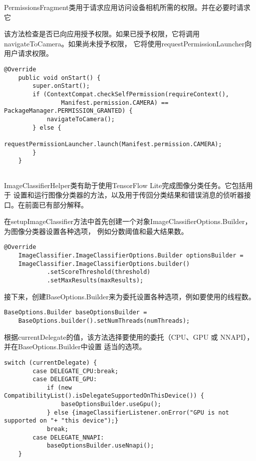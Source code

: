 PermissionsFragment类用于请求应用访问设备相机所需的权限。并在必要时请求它

该方法检查是否已向应用授予权限。如果已授予权限，它将调用navigateToCamera。如果尚未授予权限，
它将使用requestPermissionLauncher向用户请求权限。
\begin{lstlisting}[style=code]
    @Override
    public void onStart() {
        super.onStart();
        if (ContextCompat.checkSelfPermission(requireContext(),
                Manifest.permission.CAMERA) == PackageManager.PERMISSION_GRANTED) {
            navigateToCamera();
        } else {
            requestPermissionLauncher.launch(Manifest.permission.CAMERA);
        }
    }
    
\end{lstlisting}

ImageClassifierHelper类有助于使用TensorFlow Lite完成图像分类任务。它包括用于
设置和运行图像分类器的方法，以及用于传回分类结果和错误消息的侦听器接口。在前面已有部分解释。

在setupImageClassifier方法中首先创建一个对象ImageClassifierOptions.Builder，为图像分类器设置各种选项，
例如分数阈值和最大结果数。
\begin{lstlisting}[style=code]
    @Override
    ImageClassifier.ImageClassifierOptions.Builder optionsBuilder =
    ImageClassifier.ImageClassifierOptions.builder()
            .setScoreThreshold(threshold)
            .setMaxResults(maxResults);
\end{lstlisting}

接下来，创建BaseOptions.Builder来为委托设置各种选项，例如要使用的线程数。
\begin{lstlisting}[style=code]
    BaseOptions.Builder baseOptionsBuilder =
    BaseOptions.builder().setNumThreads(numThreads);
\end{lstlisting}

根据currentDelegate的值，该方法选择要使用的委托（CPU、GPU 或 NNAPI），并在BaseOptions.Builder中设置
适当的选项。
\begin{lstlisting}[style=code]
    switch (currentDelegate) {
        case DELEGATE_CPU:break;
        case DELEGATE_GPU:
            if (new CompatibilityList().isDelegateSupportedOnThisDevice()) {
                baseOptionsBuilder.useGpu();
            } else {imageClassifierListener.onError("GPU is not supported on "+ "this device");}
            break;
        case DELEGATE_NNAPI:
            baseOptionsBuilder.useNnapi();
    }
\end{lstlisting}

